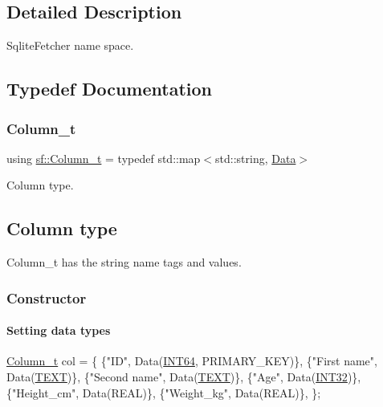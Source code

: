 \subsection{Detailed Description}
Sqlite\+Fetcher name space. 

\subsection{Typedef Documentation}
\mbox{\label{namespacesf_a390d6a976138adf32ace872bbd298a30}} 
\subsubsection{\texorpdfstring{Column\+\_\+t}{Column\_t}}
{\footnotesize\ttfamily using \hyperlink{namespacesf_a390d6a976138adf32ace872bbd298a30}{sf\+::\+Column\+\_\+t} = typedef std\+::map$<$std\+::string, \hyperlink{classsf_1_1Data}{Data}$>$}



Column type. 

\subsection*{Column type}

Column\+\_\+t has the string name tags and values.

\subsubsection*{Constructor}

\paragraph*{Setting data types}


\begin{DoxyCode}
\hyperlink{namespacesf_a390d6a976138adf32ace872bbd298a30}{Column\_t} col = \{
    \{\textcolor{stringliteral}{"ID"}, Data(\hyperlink{namespacesf_aee849ddcdbf3bdb22d912e4ab0c7b93fa2c9e1474c273bc300e25ba8f0433b835}{INT64}, PRIMARY\_KEY)\},
    \{\textcolor{stringliteral}{"First name"}, Data(\hyperlink{namespacesf_aee849ddcdbf3bdb22d912e4ab0c7b93fa193ac55158642f32159ca4b9e7b07c04}{TEXT})\},
    \{\textcolor{stringliteral}{"Second name"}, Data(\hyperlink{namespacesf_aee849ddcdbf3bdb22d912e4ab0c7b93fa193ac55158642f32159ca4b9e7b07c04}{TEXT})\},
    \{\textcolor{stringliteral}{"Age"}, Data(\hyperlink{namespacesf_aee849ddcdbf3bdb22d912e4ab0c7b93fa75189b2710fdf8a9963ff24286fb3b5c}{INT32})\},
    \{\textcolor{stringliteral}{"Height\_cm"}, Data(REAL)\},
    \{\textcolor{stringliteral}{"Weight\_kg"}, Data(REAL)\},
\};
\end{DoxyCode}


